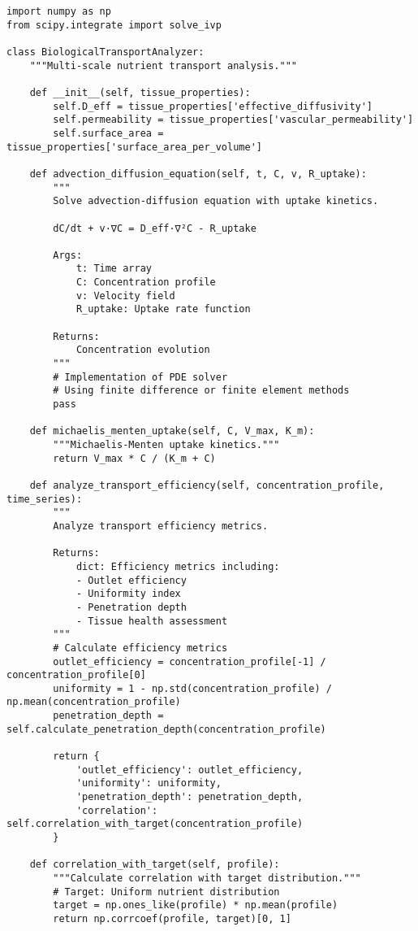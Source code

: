 \documentclass[11pt,a4paper]{article}
\begin{document}
\begin{lstlisting}[caption=Multi-Scale Biological Transport Analysis]
import numpy as np
from scipy.integrate import solve_ivp

class BiologicalTransportAnalyzer:
    """Multi-scale nutrient transport analysis."""

    def __init__(self, tissue_properties):
        self.D_eff = tissue_properties['effective_diffusivity']
        self.permeability = tissue_properties['vascular_permeability']
        self.surface_area = tissue_properties['surface_area_per_volume']

    def advection_diffusion_equation(self, t, C, v, R_uptake):
        """
        Solve advection-diffusion equation with uptake kinetics.

        dC/dt + v·∇C = D_eff·∇²C - R_uptake

        Args:
            t: Time array
            C: Concentration profile
            v: Velocity field
            R_uptake: Uptake rate function

        Returns:
            Concentration evolution
        """
        # Implementation of PDE solver
        # Using finite difference or finite element methods
        pass

    def michaelis_menten_uptake(self, C, V_max, K_m):
        """Michaelis-Menten uptake kinetics."""
        return V_max * C / (K_m + C)

    def analyze_transport_efficiency(self, concentration_profile, time_series):
        """
        Analyze transport efficiency metrics.

        Returns:
            dict: Efficiency metrics including:
            - Outlet efficiency
            - Uniformity index
            - Penetration depth
            - Tissue health assessment
        """
        # Calculate efficiency metrics
        outlet_efficiency = concentration_profile[-1] / concentration_profile[0]
        uniformity = 1 - np.std(concentration_profile) / np.mean(concentration_profile)
        penetration_depth = self.calculate_penetration_depth(concentration_profile)

        return {
            'outlet_efficiency': outlet_efficiency,
            'uniformity': uniformity,
            'penetration_depth': penetration_depth,
            'correlation': self.correlation_with_target(concentration_profile)
        }

    def correlation_with_target(self, profile):
        """Calculate correlation with target distribution."""
        # Target: Uniform nutrient distribution
        target = np.ones_like(profile) * np.mean(profile)
        return np.corrcoef(profile, target)[0, 1]
\end{lstlisting}
\end{document}
